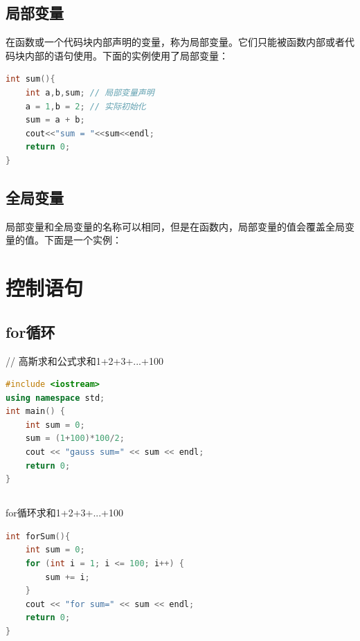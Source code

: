 \documentclass[12pt,twiside,a4paper]{ctexbook}
\numberwithin{chapter}{part}
\begin{document}
\section{局部变量}
在函数或一个代码块内部声明的变量，称为局部变量。它们只能被函数内部或者代码块内部的语句使用。下面的实例使用了局部变量：\\
\begin{lstlisting}[language=C++]
int sum(){
	int a,b,sum; // 局部变量声明
	a = 1,b = 2; // 实际初始化
	sum = a + b;
	cout<<"sum = "<<sum<<endl;
	return 0;
}
\end{lstlisting}

\section{全局变量}
局部变量和全局变量的名称可以相同，但是在函数内，局部变量的值会覆盖全局变量的值。下面是一个实例：\\


\chapter{控制语句}
\section{for循环}
// 高斯求和公式求和1+2+3+...+100
\begin{lstlisting}[language=C++]
#include <iostream>
using namespace std;
int main() {
    int sum = 0;
    sum = (1+100)*100/2;
    cout << "gauss sum=" << sum << endl;
    return 0;
}
\end{lstlisting}

\section{}
for循环求和1+2+3+...+100\\
\begin{lstlisting}[language=C++]
int forSum(){
    int sum = 0;
    for (int i = 1; i <= 100; i++) {
        sum += i;
    }
    cout << "for sum=" << sum << endl;
    return 0;
}
\end{lstlisting}
\end{document}
